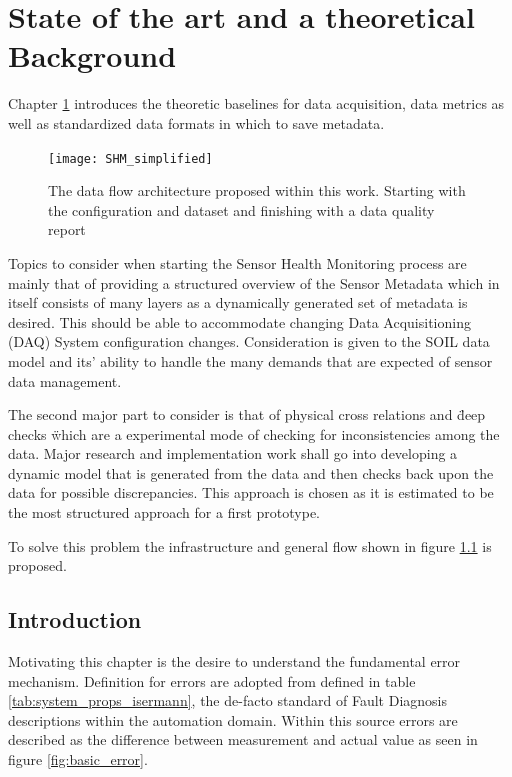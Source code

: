 

\chapter{State of the art and a theoretical Background}
\label{chap:2}

Chapter \ref{chap:2} introduces the theoretic baselines for data acquisition, data metrics as well as standardized data formats in which to save metadata.

\begin{figure}[!h]
    \centering
    \texttt{[image: SHM\_simplified]}
    \caption{The data flow architecture proposed within this work. Starting with the configuration and dataset and finishing with a data quality report}
    \label{fig:SHM_simplified}
\end{figure}
Topics to consider when starting the Sensor Health Monitoring process are mainly that of providing a structured overview of the Sensor Metadata which in itself consists of many layers as a dynamically generated set of metadata is desired. This should be able to accommodate changing Data Acquisitioning (DAQ) System configuration changes. Consideration is given to the SOIL data model and its' ability to handle the many demands that are expected of sensor data management. \cite{behrens_domain-specific_2021}


The second major part to consider is that of physical cross relations and \" deep checks \" which are a experimental mode of checking for inconsistencies among the data. Major research and implementation work shall go into developing a dynamic model that is generated from the data and then checks back upon the data for possible discrepancies. This approach is chosen as it is estimated to be the most structured approach for a first prototype.


To solve this problem the infrastructure and general flow shown in figure \ref{fig:SHM_simplified} is proposed.


\section{Introduction}

Motivating this chapter is the desire to understand the fundamental error mechanism. Definition for errors are adopted from \textcite{isermann_fault-diagnosis_2006} defined in table \ref{tab:system_props_isermann}, the de-facto standard of Fault Diagnosis descriptions within the automation domain. Within this source errors are described as the difference between measurement and actual value as seen in figure \ref{fig:basic_error}.

